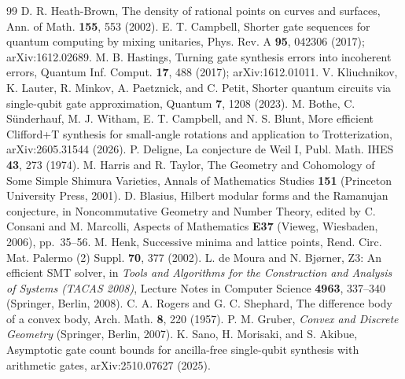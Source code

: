 \documentclass[aps,prx,twocolumn,superscriptaddress,nofootinbib,longbibliography]{revtex4-2}
\theoremstyle{plain}
\theoremstyle{definition}
\theoremstyle{remark}
\begin{document}
\begin{thebibliography}{99}
 D. R. Heath-Brown, The density of rational points on curves and surfaces, Ann. of Math. \textbf{155}, 553 (2002).
 E. T. Campbell, Shorter gate sequences for quantum computing by mixing unitaries, Phys. Rev. A \textbf{95}, 042306 (2017); arXiv:1612.02689.
 M. B. Hastings, Turning gate synthesis errors into incoherent errors, Quantum Inf. Comput. \textbf{17}, 488 (2017); arXiv:1612.01011.
 V. Kliuchnikov, K. Lauter, R. Minkov, A. Paetznick, and C. Petit, Shorter quantum circuits via single-qubit gate approximation, Quantum \textbf{7}, 1208 (2023).
 M. Bothe, C. S\"underhauf, M. J. Witham, E. T. Campbell, and N. S. Blunt, More efficient Clifford+T synthesis for small-angle rotations and application to Trotterization, arXiv:2605.31544 (2026).
 P. Deligne, La conjecture de Weil I, Publ. Math. IHES \textbf{43}, 273 (1974).
 M. Harris and R. Taylor, The Geometry and Cohomology of Some Simple Shimura Varieties, Annals of Mathematics Studies \textbf{151} (Princeton University Press, 2001).
 D. Blasius, Hilbert modular forms and the Ramanujan conjecture, in Noncommutative Geometry and Number Theory, edited by C. Consani and M. Marcolli, Aspects of Mathematics \textbf{E37} (Vieweg, Wiesbaden, 2006), pp.~35--56.
 M. Henk, Successive minima and lattice points, Rend. Circ. Mat. Palermo (2) Suppl. \textbf{70}, 377 (2002).
 L. de Moura and N. Bj{\o}rner, Z3: An efficient SMT solver, in \emph{Tools and Algorithms for the Construction and Analysis of Systems (TACAS 2008)}, Lecture Notes in Computer Science \textbf{4963}, 337--340 (Springer, Berlin, 2008).
 C. A. Rogers and G. C. Shephard, The difference body of a convex body, Arch. Math. \textbf{8}, 220 (1957).
 P. M. Gruber, \emph{Convex and Discrete Geometry} (Springer, Berlin, 2007).
 K. Sano, H. Morisaki, and S. Akibue, Asymptotic gate count bounds for ancilla-free single-qubit synthesis with arithmetic gates, arXiv:2510.07627 (2025).
\end{thebibliography}
\end{document}
